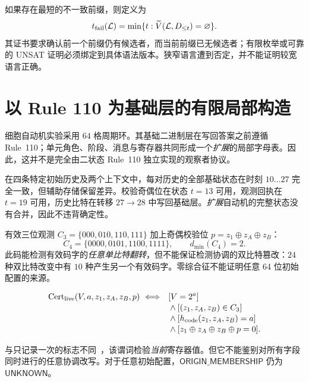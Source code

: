 \documentclass[11pt,a4paper,UTF8,fontset=none]{ctexart}
\newcommand{\VS}{\widetilde V}
\newcommand{\vstatus}[1]{\textsf{#1}}
\begin{document}
如果存在最短的不一致前缀，则定义为
\begin{equation}\label{eq:failprefix}
t_{\rm fail}(\mathcal L)=\min\{t:\VS(\mathcal L,D_{\le t})=\varnothing\}.
\end{equation}
其证书要求确认前一个前缀仍有候选者，而当前前缀已无候选者；有限枚举或可靠的 UNSAT 证明必须绑定到具体语法版本。狭窄语言遭到否定，并不能证明较宽语言正确。

\section{以 Rule 110 为基础层的有限局部构造}

细胞自动机实验采用 $64$ 格周期环。其基础二进制层在写回答案之前遵循 Rule~110；单元角色、阶段、消息与寄存器共同形成一个\emph{扩展}的局部字母表。因此，这并不是完全由二状态 Rule~110 独立实现的观察者协议。

在四条特定初始历史及两个上下文中，每对历史的全部基础状态在时刻 $10\ldots27$ 完全一致，但辅助存储保留差异。校验奇偶位在状态 $t=13$ 可用，观测回执在 $t=19$ 可用，历史比特在转移 $27\to28$ 中写回基础层。\emph{扩展}自动机的完整状态没有合并，因此不违背确定性。

有效三位观测 $C_3=\{000,010,110,111\}$ 加上奇偶校验位 $p=z_1\oplus z_A\oplus z_B$：
\begin{equation}\label{eq:code}
C_4=\{0000,0101,1100,1111\},\qquad d_{\min}(C_4)=2.
\end{equation}
此码能检测有效码字的\emph{任意单比特翻转}，但不能保证检测协调的双比特篡改：$24$ 种双比特改变中有 $10$ 种产生另一个有效码字。零综合征不能证明任意 64 位初始配置的来源。

\begin{equation}\label{eq:live}
\begin{aligned}
\mathrm{Cert}_{\rm live}(V,a,z_1,z_A,z_B,p)\ \Longleftrightarrow\quad
 &[V=2^a]\\[-2pt]
 &\land[(z_1,z_A,z_B)\in C_3]\\[-2pt]
 &\land[h_{\rm code}(z_1,z_A,z_B)=a]\\[-2pt]
 &\land[z_1\oplus z_A\oplus z_B\oplus p=0].
\end{aligned}
\end{equation}

与只记录一次的标志不同~\cite{leucker2009}，该谓词检验\emph{当前}寄存器值。但它不能鉴别对所有字段同时进行的任意协调改写。对于任意初始配置，$\vstatus{ORIGIN\_MEMBERSHIP}$ 仍为 $\vstatus{UNKNOWN}$。
\end{document}
